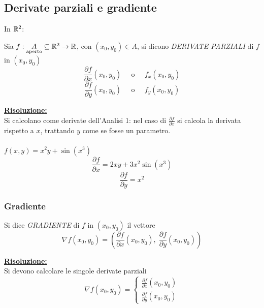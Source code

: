 \subsection{Derivate parziali e gradiente}
In $\mathbb{R}^2$:

\begin{definition}
    Sia $f : \underset{\mbox{\scriptsize{aperto}}}{A} \subseteq \mathbb{R}^2 \to \mathbb{R}$, con $(x_0, y_0) \in A$, si dicono \emph{DERIVATE PARZIALI} di $f$ in $(x_0, y_0)$
    \begin{equation}
        \frac{\partial f}{\partial x}(x_0, y_0) \mspace{25mu} \mbox{o} \mspace{25mu} f_x(x_0, y_0)
    \end{equation}
    \begin{equation}
        \frac{\partial f}{\partial y}(x_0, y_0) \mspace{25mu} \mbox{o} \mspace{25mu} f_y(x_0, y_0)
    \end{equation}
\end{definition}

\underline{\textbf{Risoluzione:}}\\
Si calcolano come derivate dell'Analisi 1: nel caso di $\frac{\partial f}{\partial x}$ si calcola la derivata rispetto a $x$, trattando $y$ come se fosse un parametro.\\

\es \\
$f(x, y) = x^2 y + \sin(x^3)$
\[ \frac{\partial f}{\partial x} = 2xy + 3x^2 \sin(x^3) \]
\[ \frac{\partial f}{\partial y} = x^2 \]

\subsubsection{Gradiente}
\begin{definition}[Gradiente]
    Si dice \emph{GRADIENTE} di $f$ in $(x_0, y_0)$ il vettore
    \begin{equation}
        \nabla f(x_0, y_0) = \left( \frac{\partial f}{\partial x}(x_0, y_0), \; \frac{\partial f}{\partial y}(x_0, y_0) \right)
    \end{equation}
\end{definition}

\underline{\textbf{Risoluzione:}}\\
Si devono calcolare le singole derivate parziali
\[
    \nabla f(x_0, y_0) = 
    \begin{cases}
        \frac{\partial f}{\partial x}(x_0, y_0)\\
        \frac{\partial f}{\partial y}(x_0, y_0)
    \end{cases}
\]

